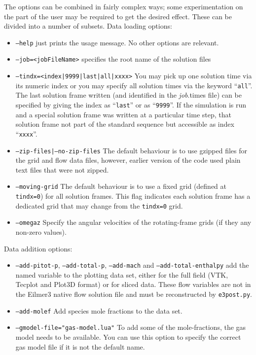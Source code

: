 \noindent
The options can be combined in fairly complex ways; some experimentation on the part of the user
may be required to get the desired effect.
These can be divided into a number of subsets.
Data loading options:
\begin{itemize}
  \item \texttt{--help} just prints the usage message.  No other options are relevant.
  \item \texttt{--job=<jobFileName>} specifies the root name of the solution files
  \item \texttt{--tindx=<index|9999|last|all|xxxx>} You may pick up one solution time via its numeric index or you may
     specify all solution times via the keyword ``\texttt{all}''. 
     The last solution frame written (and identified in the \textit{job}.times file) can be specified by giving
     the index as ``\texttt{last}'' or as ``\texttt{9999}''.
     If the simulation is run and a special solution frame was written at a particular time step, 
     that solution frame not part of the standard sequence but accessible as index ``\texttt{xxxx}''.
  \item \texttt{--zip-files|--no-zip-files} The default behaviour is to use gzipped files for the
     grid and flow data files, however, earlier version of the code used plain text files that were not zipped.
  \item \texttt{--moving-grid} The default behaviour is to use a fixed grid (defined at \texttt{tindx=0}) for all
     solution frames.
     This flag indicates each solution frame has a dedicated grid that may change from the \texttt{tindx=0} grid.
  \item \texttt{--omegaz} Specify the angular velocities of the rotating-frame grids (if they any non-zero values).
\end{itemize}
Data addition options:
\begin{itemize}
  \item \texttt{--add-pitot-p}, \texttt{--add-total-p}, \texttt{--add-mach} and \texttt{--add-total-enthalpy} add the
     named variable to the plotting data set, either for the full field (VTK, Tecplot and Plot3D format) or for sliced data.
     These flow variables are not in the Eilmer3 native flow solution file and must be reconstructed by \texttt{e3post.py}.
  \item \texttt{--add-molef} Add species mole fractions to the data set.
  \item \texttt{--gmodel-file="gas-model.lua"} To add some of the mole-fractions, the gas model needs to
     be available.  You can use this option to specify the correct gas model file if it is not the default name.
\end{itemize}
